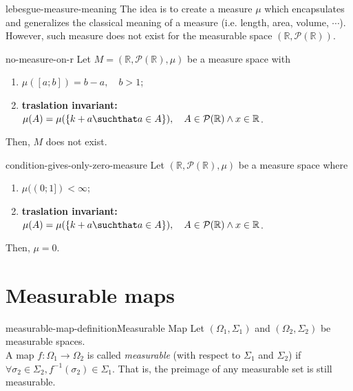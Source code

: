 \documentclass[preview]{standalone}
\begin{document}
\genpage

\begin{snippet}{lebesgue-measure-meaning}
    The idea is to create a measure \(\mu\) which encapsulates
    and generalizes the classical meaning of a measure (i.e. length, area, volume, \(\cdots\)).
    However, such measure does not exist for the measurable space \((\mathbb{R}, \mathcal{P}(\mathbb{R}))\).
\end{snippet}

\begin{snippettheorem}{no-measure-on-r}{}
    Let \(M=(\mathbb{R}, \mathcal{P}(\mathbb{R}), \mu)\)
    be a measure space with
    \begin{enumerate}
        \item \(\mu([a;b]) = b-a, \quad b>1\);
        \item \textbf{traslation invariant:} \(\mu(A) = \mu(\{k + a \suchthat a \in A\}), \quad A \in \mathcal{P}(\mathbb{R}) \land x \in \mathbb{R}\).
    \end{enumerate}
    Then, \(M\) does not exist.
\end{snippettheorem}

\begin{snippetproposition}{condition-gives-only-zero-measure}{}
    Let \((\mathbb{R}, \mathcal{P}(\mathbb{R}), \mu)\) be a measure space where
    \begin{enumerate}
        \item \(\mu((0; 1]) < \infty\);
        \item \textbf{traslation invariant:} \(\mu(A) = \mu(\{k + a \suchthat a \in A\}), \quad A \in \mathcal{P}(\mathbb{R}) \land x \in \mathbb{R}\).
    \end{enumerate}
    Then, \(\mu = 0\).
\end{snippetproposition}


\section{Measurable maps}

\begin{snippetdefinition}{measurable-map-definition}{Measurable Map}
    Let \((\Omega_1, \Sigma_1)\) and \((\Omega_2, \Sigma_2)\) be measurable spaces. \\
    A map \(f \colon \Omega_1 \to \Omega_2\) is called \textit{measurable} (with respect to \(\Sigma_1\) and \(\Sigma_2\))
    if \(\forall \sigma_2 \in \Sigma_2, f^{-1}(\sigma_2) \in \Sigma_1\).
    That is, the preimage of any measurable set is still measurable.
\end{snippetdefinition}
\end{document}
